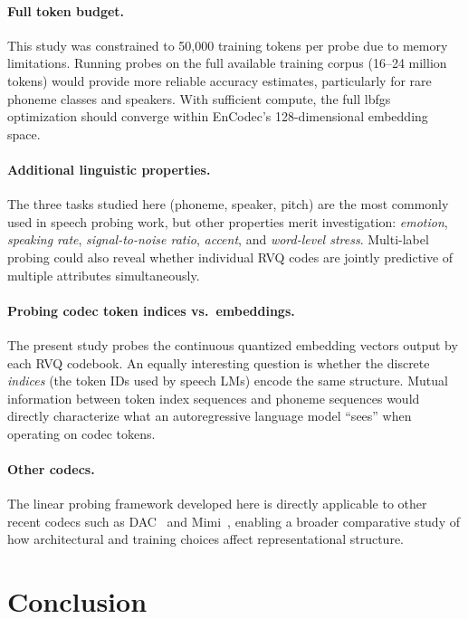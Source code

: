 \documentclass[10pt,twocolumn]{article}
\begin{document}
\paragraph{Full token budget.}
This study was constrained to 50,000 training tokens per probe due to
memory limitations. Running probes on the full available training corpus
(16--24 million tokens) would provide more reliable accuracy estimates,
particularly for rare phoneme classes and speakers. With sufficient
compute, the full lbfgs optimization should converge within EnCodec's
128-dimensional embedding space.

\paragraph{Additional linguistic properties.}
The three tasks studied here (phoneme, speaker, pitch) are the most
commonly used in speech probing work, but other properties merit
investigation: \emph{emotion}, \emph{speaking rate}, \emph{signal-to-noise
ratio}, \emph{accent}, and \emph{word-level stress}. Multi-label probing
could also reveal whether individual RVQ codes are jointly predictive
of multiple attributes simultaneously.

\paragraph{Probing codec token indices vs.\ embeddings.}
The present study probes the continuous quantized embedding vectors
output by each RVQ codebook. An equally interesting question is whether
the discrete \emph{indices} (the token IDs used by speech LMs) encode
the same structure. Mutual information between token index sequences and
phoneme sequences would directly characterize what an autoregressive
language model ``sees'' when operating on codec tokens.

\paragraph{Other codecs.}
The linear probing framework developed here is directly applicable to
other recent codecs such as DAC~\cite{kumar2023} and
Mimi~\cite{defossez2024}, enabling a broader comparative study of how
architectural and training choices affect representational structure.

\section{Conclusion}
\end{document}
